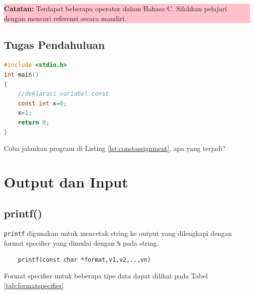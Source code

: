 \begin{center}
	\colorbox{pink}{\parbox{0.8\linewidth}{\textbf{Catatan:} Terdapat beberapa operator dalam Bahasa C. Silahkan pelajari dengan mencari referensi secara mandiri.}}
\end{center}
\subsection{Tugas Pendahuluan}
\begin{lstlisting}[language=c,caption=Menggunakan operator penugasan pada variabel const,label=lst:constassignment,captionpos=t]
#include <stdio.h>
int main()
{
    //deklarasi variabel const
    const int x=0;
    x=1;
	return 0;
}
\end{lstlisting}
Coba jalankan program di Listing \ref{lst:constassignment}, apa yang terjadi?


\section{Output dan Input}

\subsection{printf()}
\verb*|printf|  digunakan untuk mencetak string  ke output yang dilengkapi dengan format specifier yang dimulai dengan \verb*|%| pada string.

\begin{verbatim}
	printf(const char *format,v1,v2,..,vn)
\end{verbatim}

Format specifier untuk beberapa tipe data dapat dilihat pada Tabel \ref{tab:formatspecifier}



